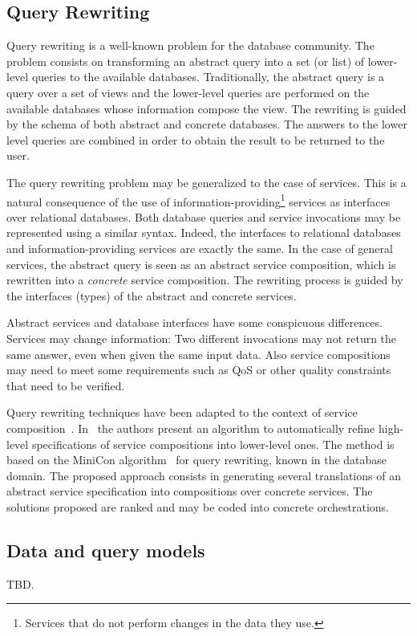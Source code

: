 \subsection{Query Rewriting}
\label{sec:queryRew}


Query rewriting is a well-known problem for the database community.
The problem consists on transforming an abstract query into a set (or list) of lower-level queries to the available databases.
Traditionally, the abstract query is a query over a set of views and the lower-level queries are performed on the available databases whose information compose the view. 
The rewriting is guided by the schema of both abstract and concrete databases.
The answers to the lower level queries are combined in order to obtain the result to be returned to the user.

The query rewriting problem may be generalized to the case of services.
This is a natural consequence of the use of information-providing\footnote{Services that do not perform changes in the data they use.} services as interfaces over relational databases.
Both database queries and service invocations may be represented using a similar syntax.
Indeed, the interfaces to relational databases and information-providing services are exactly the same.
In the case of general services, the abstract query is seen as an abstract service composition, which is rewritten into a \textit{concrete} service composition.
The rewriting process is guided by the interfaces (types) of the abstract and concrete services.

Abstract services and database interfaces have some conspicuous differences.
Services may change information: Two different invocations may not return the same answer, even when given the same input data.
Also service compositions may need to meet some requirements such as QoS or other quality constraints that need to be verified.

Query rewriting techniques have been adapted to the context of service composition~\cite{queryRewriting}. 
In~\cite{UmbertoICWE2013} the authors present an algorithm to automatically refine high-level specifications of service compositions into lower-level ones. 
The method is based on the MiniCon algorithm~\cite{PH01} for query rewriting,  known in the database domain.
The proposed approach consists in generating several translations of an abstract service specification into compositions
over concrete  services. 
The solutions proposed are ranked and may be coded into concrete orchestrations. 





\subsection{Data and query models}
\label{sec:dqm}

TBD.
